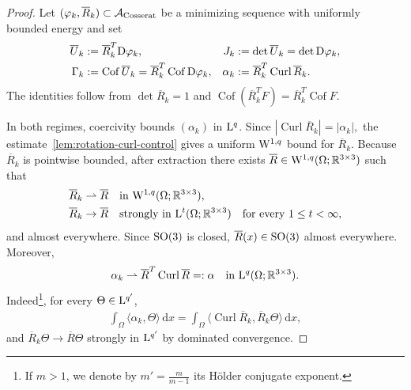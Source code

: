 \documentclass[11pt]{article}
\begin{document}
\begin{proof}
Let $(\varphi_k, \overline R _k)\subset\mathcal A_{\rm Cosserat}$ be a minimizing sequence with uniformly bounded energy and set
\begin{align}
\overline U_k&:= \overline R _k^T{\rm D}\varphi_k,
&J_k&:=\det \overline U_k=\det{\rm D}\varphi_k,
\notag\\
\Gamma_k&:=\operatorname{Cof}\overline U_k
= \overline R _k^T\operatorname{Cof}{\rm D}\varphi_k,
&\alpha_k&:= \overline R _k^T\operatorname{Curl} \overline R _k.
\end{align}
The identities follow from $\det \overline R _k=1$ and
$
\operatorname{Cof}( \overline R _k^TF)
= \overline R _k^T\operatorname{Cof}F.
$

In both regimes, coercivity bounds $(\alpha_k)$ in ${\rm L}^q$. Since
$
|\operatorname{Curl} \overline R _k|=|\alpha_k|,
$
the estimate~\ref{lem:rotation-curl-control} gives a uniform ${\rm W}^{1,q}$ bound for $ \overline R _k$. Because $ \overline R _k$ is pointwise bounded, after extraction there exists $ \overline R \in {\rm W}^{1,q}(\Omega;\mathbb R^{3\times3})$ such that
\begin{align}
 \overline R _k&\rightharpoonup \overline R 
&&\text{in }{\rm W}^{1,q}(\Omega;\mathbb R^{3\times3}),
\notag\\
 \overline R _k&\to \overline R 
&&\text{strongly in }{\rm L}^t(\Omega;\mathbb R^{3\times3})
\quad\text{for every }1\leq t<\infty,
\end{align}
and almost everywhere. Since ${\rm SO}(3)$ is closed, $ \overline R (x)\in {\rm SO}(3)$ almost everywhere.
Moreover,
\begin{align}
\alpha_k
\rightharpoonup
 \overline R ^T\operatorname{Curl} \overline R 
=: \alpha
\quad\text{in }{\rm L}^q(\Omega;\mathbb R^{3\times3}).
\end{align}
Indeed\footnote{If \(m>1\), we denote by $m'=\frac{m}{m-1}$ its H\"older conjugate exponent.}, for every $\Theta\in {\rm L}^{q'}$,
\begin{align}
\int_\Omega\langle\alpha_k,\Theta\rangle\,\mathrm dx
=
\int_\Omega
\langle\operatorname{Curl} \overline R _k, \overline R _k\Theta\rangle\,\mathrm dx,
\end{align}
and $ \overline R _k\Theta\to \overline R \Theta$ strongly in ${\rm L}^{q'}$ by dominated convergence.


\end{proof}
\end{document}
